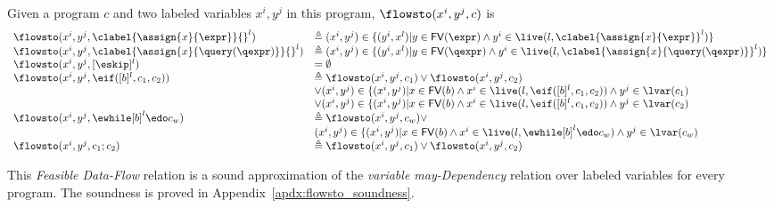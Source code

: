 \begin{defn}
  \label{def:feasible_flowsto}
  Given a program $c$ and two labeled variables $x^i, y^j$  in this program, 
  $\flowsto(x^i, y^j, c)$ is 
    {\footnotesize
    \[
   \begin{array}{ll}
    \flowsto(x^i, y^j, \clabel{\assign{x}{\expr}}{}^l)  & \triangleq (x^i, y^j) \in \{ (y^i, x^l) | y \in \mathsf{FV}(\expr) 
    \land y^i \in \live(l, \clabel{\assign{x}{\expr}}^l) \}  \\
    \flowsto(x^i, y^j, \clabel{\assign{x}{\query(\qexpr)}}{}^l)  & \triangleq (x^i, y^j) \in \{ (y^i, x^l) | y \in \mathsf{FV}(\qexpr) 
    \land y^i \in \live(l,\clabel{\assign{x}{\query(\qexpr)}}^l) \}  \\
    \flowsto(x^i, y^j, [\eskip]^{l})  & = \emptyset \\
    \flowsto(x^i, y^j, \eif ([b]^l, c_1, c_2))  & \triangleq \flowsto(x^i, y^j, c_1) \lor \flowsto(x^i, y^j, c_2) \\ 
        & \lor (x^i, y^j) \in
       \{(x^i,y^j) | x \in \mathsf{FV}(b) \land 
      x^i \in \live(l, \eif ([b]^l, c_1, c_2)) \land  y^j \in \lvar(c_1) \\
       &\lor (x^i, y^j) \in \{(x^i,y^j) | x \in \mathsf{FV}(b) \land 
      x^i\in \live(l, \eif ([b]^l, c_1, c_2))  \land  y^j \in \lvar(c_2) \\
       \flowsto(x^i, y^j, \ewhile [b]^l \edo c_w)  & \triangleq  \flowsto(x^i, y^j, c_w)  \lor
       \\ & 
       (x^i, y^j) \in  \{(x^i,y^j) | x \in \mathsf{FV}(b) \land 
      x^i \in \live(l,   \ewhile [b]^l \edo c_w) \land  y^j \in \lvar(c_w) \\
       \flowsto(x^i, y^j, c_1 ;c_2)  & \triangleq \flowsto(x^i, y^j, c_1) \lor \flowsto(x^i, y^j, c_2) \\
   \end{array}
   \]
   }
   \end{defn}
%
This \emph{Feasible Data-Flow} relation is a sound approximation 
of the \emph{variable may-Dependency} relation over labeled variables for every program.
The soundness is proved
in Appendix~\ref{apdx:flowsto_soundness}.
%
